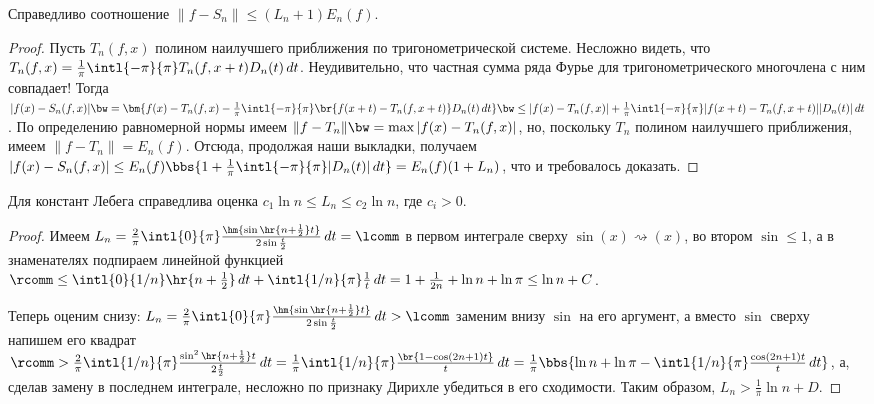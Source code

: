 \documentclass[a4paper]{article}
\newcommand{\intlop}{\intl{0}{\pi}}
\newcommand{\intlpp}{\intl{-\pi}{\pi}}
\newcommand{\frpi}{\frac{1}{\pi}}
\begin{document}
\begin{theorem}[Лебега]
Справедливо соотношение $\|f - S_n\| \le (L_n + 1)E_n(f)$.
\end{theorem}
\begin{proof}
Пусть $T_n(f,x)$ полином наилучшего приближения по тригонометрической системе. Несложно видеть,
что $T_n(f,x) = \frpi \intlpp T_n(f,x+t)D_n(t)\,d t$. Неудивительно, что частная сумма ряда Фурье
для тригонометрического многочлена с ним совпадает! Тогда $|f(x) - S_n(f,x)| \bw= \bm{f(x) - T_n(f,x)
- \frpi \intlpp\br{f(x+t)-T_n(f,x+t)}D_n(t)\,d t} \bw\le |f(x) - T_n(f,x)| + \frpi \intlpp|f(x+t) -
T_n(f,x+t)||D_n(t)|\,d t$. По определению равномерной нормы имеем $\|f - T_n\| \bw= \max |f(x) -
T_n(f,x)|$, но, поскольку $T_n$ полином наилучшего приближения, имеем $\|f - T_n\| = E_n(f)$.
Отсюда, продолжая наши выкладки, получаем $|f(x) - S_n(f,x)| \le E_n(f)\bbs{1 + \frpi
\intlpp|D_n(t)|\,d t}= E_n(f)(1 + L_n)$, что и требовалось доказать.
\end{proof}

\begin{theorem}
Для констант Лебега справедлива оценка $c_1\ln n \le L_n \le c_2 \ln n$, где $c_i > 0$.
\end{theorem}
\begin{proof}
Имеем $L_n = \frac{2}{\pi}\intlop\frac{\hm{\sin\hr{n+\frac{1}{2}}t}}{2\sin \frac{t}{2}}\,d t =
\lcomm$ в первом интеграле сверху $\sin(x) \rightsquigarrow (x)$, во втором $\sin \le 1$, а в
знаменателях подпираем линейной функцией $\rcomm \le \intl{0}{1/n}\hr{n + \frac{1}{2}}\,d t +
\intl{1/n}{\pi}\frac{1}{t}\,d t = 1 + \frac{1}{2n} + \ln n + \ln \pi \le \ln n + C$.

Теперь оценим снизу: $L_n = \frac{2}{\pi}\intlop\frac{\hm{\sin\hr{n+\frac{1}{2}}t}}{2\sin
\frac{t}{2}}\,d t > \lcomm$ заменим внизу $\sin$ на его аргумент, а вместо $\sin$ сверху напишем
его квадрат $\rcomm > \frac{2}{\pi}\intl{1/n}{\pi}\frac{\sin^2\hr{n + \frac{1}{2}} t}{2
\frac{t}{2}}\,d t = \frpi \intl{1/n}{\pi}\frac{\br{1 - \cos(2n+1)t}}{t}\,d t = \frpi \bbs{\ln n +
\ln \pi - \intl{1/n}{\pi}\frac{\cos(2n+1)t}{t}\,d t}$, а, сделав замену в последнем интеграле,
несложно по признаку Дирихле убедиться в его сходимости. Таким образом, $L_n > \frpi \ln n + D$.
\end{proof}
\end{document}
